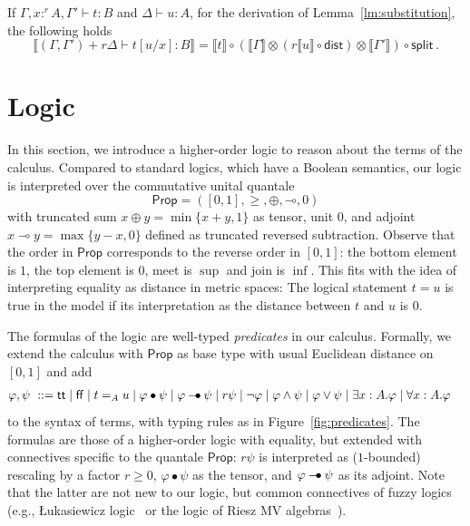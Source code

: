 \documentclass[a4paper,UKenglish,cleveref, autoref, thm-restate]{lipics-v2021}
\newcommand{\lol}{\mathbin{\multimap}}
\newcommand{\mprod}{\otimes}
\newcommand{\uinterval}{[0,1]}
\newcommand{\scaling}{}
\newcommand{\splt}{\mathsf{split}}
\newcommand{\distribute}{\mathsf{dist}}
\newcommand{\swap}{\mathsf{swap}}
\newcommand{\ts}{\vdash}
\newcommand{\hastype}[3]{#1\ts #2 : #3}
\newcommand{\Prop}{\mathsf{Prop}}
\newcommand{\true}{\mathsf{tt}}
\newcommand{\false}{\mathsf{ff}}
\newcommand{\ltensor}{*}
\renewcommand{\ltensor}{\bullet}
\newcommand{\lexp}{\mathbin{{-}\kern-.2em\raisebox{0ex}{$*$}}}
\renewcommand{\lexp}{\mathbin{{-}\kern-.2em\raisebox{0ex}{$\bullet$}}}
\newcommand{\peq}{=}
\newcommand{\den}[1]{\llbracket #1\rrbracket}
\begin{document}
\begin{lemma} \label{lem:sem:subst}
If $\hastype{\Gamma, x:^rA, \Gamma'}{t}{B}$ and $\hastype{\Delta}{u}{A}$, for the derivation of Lemma~\ref{lm:substitution}, the following holds 
\[
  \den{\hastype{(\Gamma,\Gamma') + r \scaling \Delta}{t[u/x]}{B}}
  = \den{t} \circ 
  (\den{\Gamma} \mprod (r \den{u} \!\circ\! \distribute)\mprod \den{\Gamma'})
  \circ \splt \,.
\]
\end{lemma}

\section{Logic} \label{sec:logic}

In this section, we introduce a higher-order logic to reason about
the terms of the calculus. 
Compared to standard logics, which have a Boolean semantics, our logic is interpreted over the commutative unital quantale 
\begin{equation*}
    \Prop = (\uinterval, \geq, \oplus, \lol, 0)
\end{equation*}
with truncated sum $x \oplus y = \min \{x+y, 1\}$ as tensor, unit $0$, and adjoint $x \lol y = \max \{y - x, 0 \}$ defined as truncated reversed subtraction. Observe that the order in $\Prop$ corresponds to the reverse order in $\uinterval$: the bottom element is $1$, the top element is $0$, meet is $\sup$ and join is $\inf$. This fits with the idea of interpreting equality as distance in metric spaces: The 
logical statement $t \peq u$ is true in the model if its interpretation as the distance between $t$ and $u$ is $0$. 


The formulas of the logic are well-typed \emph{predicates} in our calculus. Formally, we extend the calculus with $\Prop$ as base type with usual Euclidean distance on $\uinterval$ and add
\begin{align*}
 \varphi,\psi \ &{} ::= {}
  \true \mid \false \mid t \peq_A u \mid \varphi\ltensor\psi \mid \varphi\lexp\psi \mid r\psi 
  \mid \neg\varphi \mid \varphi\wedge\psi \mid \varphi\vee\psi \mid
  \exists x:A.\varphi \mid \forall x:A.\varphi
\end{align*}
to the syntax of terms, with typing rules as in Figure~\ref{fig:predicates}.
The formulas are those of a higher-order logic with equality, but extended with connectives specific to the quantale $\Prop$: $r\psi$ is interpreted as ($1$-bounded) rescaling by a factor $r\geq 0$, $\varphi\ltensor\psi$ as the tensor, and $\varphi\lexp\psi$ as its adjoint. 
Note that the latter are not new to our logic, but common connectives of fuzzy logics 
(e.g., {\L}ukasiewicz logic~\cite{Lukasiewicz,tarski1983logic} or the logic of Riesz MV algebras~\cite{NolaL11}).
\end{document}
